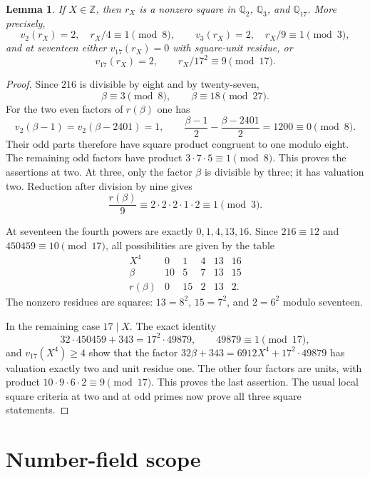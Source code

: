 \documentclass[11pt,a4paper]{article}
\newtheorem{lemma}[theorem]{Lemma}
\theoremstyle{definition}
\theoremstyle{remark}
\begin{document}
\begin{lemma}\label{sn:local-squares}
If $X\in\mathbb Z$, then $r_X$ is a nonzero square in
$\mathbb Q_2$, $\mathbb Q_3$, and $\mathbb Q_{17}$.
More precisely,
\[
 v_2(r_X)=2,\quad r_X/4\equiv1\pmod8,
 \qquad
 v_3(r_X)=2,\quad r_X/9\equiv1\pmod3,
\]
and at seventeen either $v_{17}(r_X)=0$ with square-unit
residue, or
\[
                    v_{17}(r_X)=2,\qquad
                    r_X/17^2\equiv9\pmod{17}.
\]
\end{lemma}
\begin{proof}
Since $216$ is divisible by eight and by twenty-seven,
\[
                    \beta\equiv3\pmod8,
                    \qquad\beta\equiv18\pmod{27}.
\]
For the two even factors of $r(\beta)$ one has
\[
 v_2(\beta-1)=v_2(\beta-2401)=1,
 \qquad
 \frac{\beta-1}{2}-\frac{\beta-2401}{2}=1200\equiv0\pmod8.
\]
Their odd parts therefore have square product congruent to one
modulo eight.  The remaining odd factors have product
$3\cdot7\cdot5\equiv1\pmod8$.  This proves the assertions
at two.  At three, only the factor $\beta$ is divisible by
three; it has valuation two.  Reduction after division by nine
gives
\[
 \frac{r(\beta)}9\equiv
       2\cdot2\cdot2\cdot1\cdot2\equiv1\pmod3.
\]

At seventeen the fourth powers are exactly $0,1,4,13,16$.
Since $216\equiv12$ and $450459\equiv10\pmod{17}$, all
possibilities are given by the table
\[
\begin{array}{c|rrrrr}
 X^4&0&1&4&13&16\\\hline
 \beta&10&5&7&13&15\\
 r(\beta)&0&15&2&13&2.
\end{array}
\]
The nonzero residues are squares: $13=8^2$, $15=7^2$, and
$2=6^2$ modulo seventeen.

In the remaining case $17\mid X$.  The exact identity
\[
 32\cdot450459+343=17^2\cdot49879,
 \qquad 49879\equiv1\pmod{17},
\]
and $v_{17}(X^4)\ge4$ show that the factor
$32\beta+343=6912X^4+17^2\cdot49879$ has valuation exactly
two and unit residue one.  The other four factors are units,
with product
$10\cdot9\cdot6\cdot2\equiv9\pmod{17}$.
This proves the last assertion.  The usual local square criteria
at two and at odd primes now prove all three square statements.
\end{proof}

\section{Number-field scope}
\end{document}
